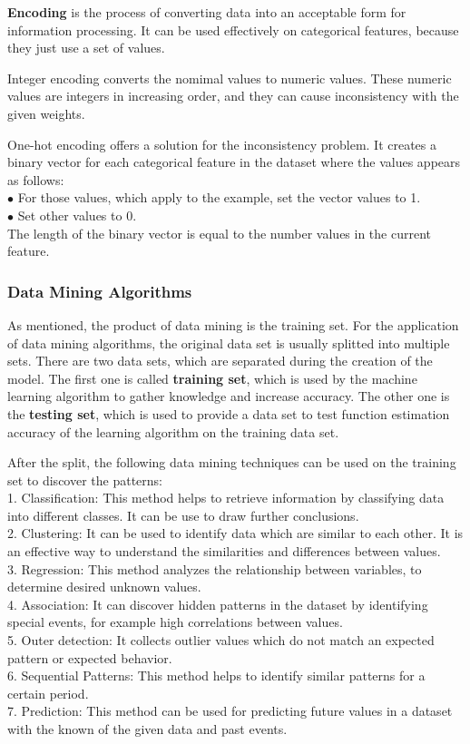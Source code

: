\textbf{Encoding} is the process of converting data into an acceptable form for information processing. It can be used effectively on categorical features, because they just use a set of values. \smallskip

Integer encoding converts the nomimal values to numeric values. These numeric values are integers in increasing order, and they can cause inconsistency with the given weights.\smallskip

One-hot encoding offers a solution for the inconsistency problem. It creates a binary vector for each categorical feature in the dataset where the values appears as follows:\\
$\bullet$ For those values, which apply to the example, set the vector values to 1.\\
$\bullet$ Set other values to 0.\\
The length of the binary vector is equal to the number values in the current feature.


\subsubsection{Data Mining Algorithms}

As mentioned, the product of data mining is the training set. For the application of data mining algorithms, the original data set is usually splitted into multiple sets. There are two data sets, which are separated during the creation of the model. The first one is called \textbf{training set}, which is used by the machine learning algorithm to gather knowledge and increase accuracy. The other one is the \textbf{testing set}, which is used to provide a data set to test function estimation accuracy of the learning algorithm on the training data set.\medskip

After the split, the following data mining techniques \cite{pujari2001data} can be used on the training set to discover the patterns:\\
1. Classification: This method helps to retrieve information by classifying data into different classes. It can be use to draw further conclusions.\\
2. Clustering: It can be used to identify data which are similar to each other. It is an effective way to understand the similarities and differences between values.\\
3. Regression:  This method analyzes the relationship between variables, to determine desired unknown values.\\
4. Association: It can discover hidden patterns in the dataset by identifying special events, for example high correlations between values.\\
5. Outer detection: It collects outlier values which do not match an expected pattern or expected behavior. \\
6. Sequential Patterns: This method helps to identify similar patterns for a certain period. \\
7. Prediction: This method can be used for predicting future values in a dataset with the known of the given data and past events.  \medskip

